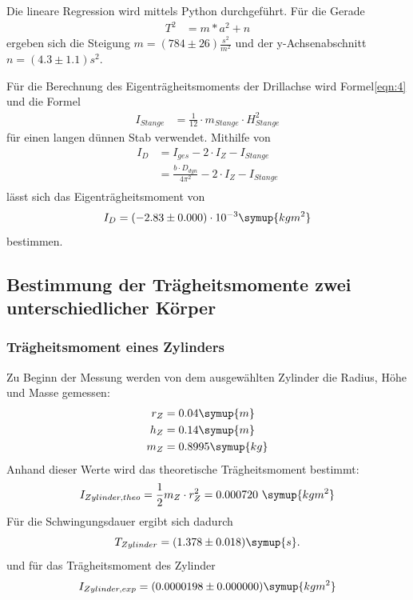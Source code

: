 \documentclass[
  bibliography=totoc,     %
  captions=tableheading,  %
  titlepage=firstiscover, %
]{scrartcl}
\begin{document}
   Die lineare Regression wird mittels Python durchgeführt. Für die Gerade
   \begin{align}
     T^2 &= m * a^2 + n
   \end{align}
   ergeben sich die Steigung $m = (784 \pm 26) \frac{s^2}{m^2}$ und der y-Achsenabschnitt $n = (4.3 \pm 1.1) s^2$.

   Für die Berechnung des Eigenträgheitsmoments der Drillachse wird Formel\ref{eqn:4} und die Formel
   \begin{align}
   I_{Stange} &= \frac{1}{12} \cdot m_{Stange} \cdot H_{Stange}^2
   \end{align}
   für einen langen dünnen Stab verwendet. Mithilfe von
   \begin{align}
     I_D        &= I_{ges} - 2 \cdot I_{Z} - I_{Stange}\\
                &= \frac{b \cdot D_{dyn}}{4 \pi^2} - 2 \cdot I_{Z} - I_{Stange}\\
   \end{align}
   lässt sich das Eigenträgheitsmoment von
   \begin{equation}
     I_D = (-2.83 \pm 0.000)\cdot10^{-3} \symup{kg m^2}
   \end{equation}
bestimmen.

\subsection{Bestimmung der Trägheitsmomente zwei unterschiedlicher Körper}
\subsubsection{Trägheitsmoment eines Zylinders}
Zu Beginn der Messung werden von dem ausgewählten Zylinder die Radius, Höhe und Masse gemessen:
\begin{align}
  r_Z &= 0.04  \symup{m} \\ %
  h_Z &= 0.14  \symup{m} \\
  m_Z &= 0.8995  \symup{kg}
\end{align}
Anhand dieser Werte wird das theoretische Trägheitsmoment bestimmt:
\begin{equation}
  I_{Zylinder,theo} = \frac{1}{2} m_Z \cdot r_Z^2 = 0.000720 \,\, \symup{kg m^2}
\end{equation}
Für die Schwingungsdauer ergibt sich dadurch %
\begin{equation}
  T_{Zylinder} = (1.378 \pm 0.018) \symup{s}.
\end{equation}
und für das Trägheitsmoment des Zylinder
\begin{equation}
  I_{Zylinder,exp} = (0.0000198 \pm 0.000000)  \symup{kg m^2} %
\end{equation}
\end{document}
